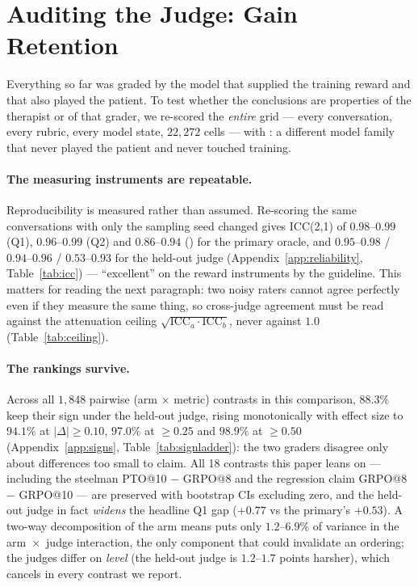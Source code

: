 \section{Auditing the Judge: Gain Retention}
\label{sec:validity}

Everything so far was graded by the model that supplied the training reward and that also
played the patient. To test whether the conclusions are properties of the therapist or of
that grader, we re-scored the \emph{entire} grid --- every conversation, every rubric, every
model state, $22{,}272$ cells --- with \heldoutjudge{}: a different model family that never
played the patient and never touched training.

\paragraph{The measuring instruments are repeatable.}
Reproducibility is measured rather than assumed. Re-scoring the same conversations with
only the sampling seed changed gives ICC(2,1) \citep{shrout1979icc} of $0.98$--$0.99$ (Q1),
$0.96$--$0.99$ (Q2) and $0.86$--$0.94$ (\mici{}) for the primary oracle, and
$0.95$--$0.98$ / $0.94$--$0.96$ / $0.53$--$0.93$ for the held-out judge
(Appendix~\ref{app:reliability}, Table~\ref{tab:icc}) --- ``excellent'' on the reward
instruments by the \citet{koo2016icc} guideline. This matters for reading the next
paragraph: two noisy raters cannot agree perfectly even if they measure the same thing, so
cross-judge agreement must be read against the attenuation ceiling
$\sqrt{\mathrm{ICC}_a \cdot \mathrm{ICC}_b}$, never against $1.0$
(Table~\ref{tab:ceiling}).

\paragraph{The rankings survive.}
Across all $1{,}848$ pairwise (arm $\times$ metric) contrasts in this comparison, $88.3\%$
keep their sign under the held-out judge, rising monotonically with effect size to $94.1\%$
at $|\Delta|\!\ge\!0.10$, $97.0\%$ at $\ge\!0.25$ and $98.9\%$ at $\ge\!0.50$ (Appendix~\ref{app:signs},
Table~\ref{tab:signladder}): the two
graders disagree only about differences too small to claim. All 18 contrasts this paper
leans on --- including the steelman PTO@10 $-$ GRPO@8 and the regression claim
GRPO@8 $-$ GRPO@10 --- are preserved with bootstrap CIs excluding zero, and the held-out
judge in fact \emph{widens} the headline Q1 gap ($+0.77$ vs the primary's $+0.53$). A
two-way decomposition of the arm means puts only $1.2$--$6.9\%$ of variance in the
arm~$\times$~judge interaction, the only component that could invalidate an ordering; the
judges differ on \emph{level} (the held-out judge is $1.2$--$1.7$ points harsher), which
cancels in every contrast we report.

